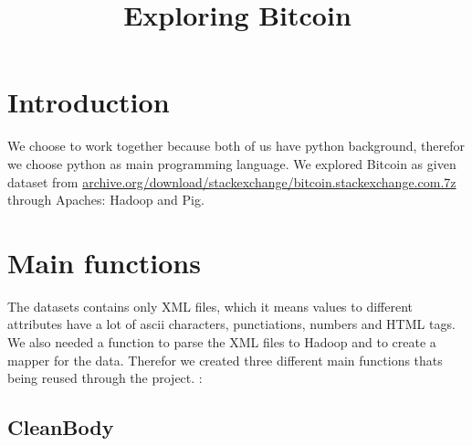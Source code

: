 \documentclass[fleqn,10pt]{wlscirep}
\title{Exploring Bitcoin }
\author{}
\begin{document}





\flushbottom
\maketitle

\tableofcontents
\newpage
\section{Introduction}
We choose to work together because both of us have python background, therefor we choose python as main programming language. We explored Bitcoin as given dataset from \url{archive.org/download/stackexchange/bitcoin.stackexchange.com.7z}  through Apaches: Hadoop and Pig. 

\section{Main functions}
The datasets contains only XML files, which it means values to different attributes have a lot of  ascii characters, punctiations, numbers and HTML tags. We also needed a function to parse the XML files to Hadoop and to create a mapper for the data.  Therefor we created three different main functions thats being reused through the project. : 
\subsection{CleanBody}
\end{document}
